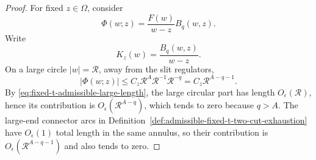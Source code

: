 \begin{proof}
For fixed \(z\in\Omega\), consider
\begin{equation}
  \Phi(w;z)=\frac{F(w)}{w-z}B_q(w,z).
  \label{eq:fixed-t-cauchy-integrand}
\end{equation}
Write
\begin{equation}
  K_z(w)=\frac{B_q(w,z)}{w-z}.
  \label{eq:fixed-t-cauchy-proof-kernel}
\end{equation}
On a large circle \(|w|=\mathcal R\), away from the slit regulators,
\[
  |\Phi(w;z)|
  \le
  C_z \mathcal R^A \mathcal R^{-1}\mathcal R^{-q}
  =C_z\mathcal R^{A-q-1}.
\]
By
\eqref{eq:fixed-t-admissible-large-length}, the large circular part has
length \(O_\epsilon(\mathcal R)\), hence its contribution is
\(O_\epsilon(\mathcal R^{A-q})\), which tends to zero because \(q>A\).
The large-end connector arcs in
Definition~\ref{def:admissible-fixed-t-two-cut-exhaustion} have
\(O_\epsilon(1)\) total length in the same annulus, so their contribution is
\(O_\epsilon(\mathcal R^{A-q-1})\) and also tends to zero.


\end{proof}
